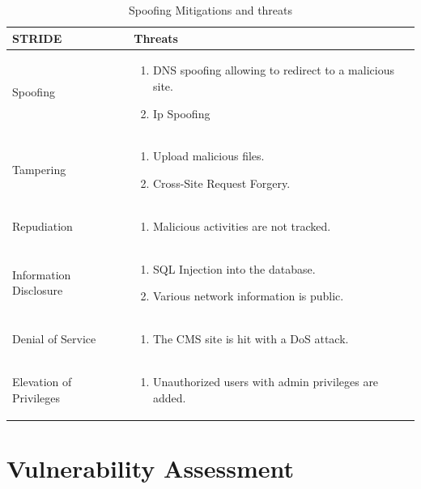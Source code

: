 \begingroup
\centering
\setlength{\tabcolsep}{6.5pt} %
\renewcommand{\arraystretch}{1.8} %
\begin{longtable}{ |p{7cm}| p{8cm} |}
\caption{Spoofing Mitigations and threats}
    \label{table:spoofing}
\hline
\textbf{STRIDE} & \textbf{Threats}\\
\hline
Spoofing & \begin{enumerate}
    \item DNS spoofing allowing to redirect to a malicious site.
    \item Ip Spoofing \citep[p.~2]{ip_spoofing}
\end{enumerate} \\
\hline
Tampering & \begin{enumerate}
    \item Upload malicious files.
    \item Cross-Site Request Forgery. \citep[p.~538]{crsf}
\end{enumerate} \\
\hline
Repudiation & \begin{enumerate}
    \item Malicious activities are not tracked.
\end{enumerate} \\
\hline
Information Disclosure & \begin{enumerate}
    \item SQL Injection into the database.
    \item Various network information is public.
\end{enumerate} \\
\hline
Denial of Service & \begin{enumerate}
    \item The CMS site is hit with a DoS attack.
\end{enumerate} \\
\hline
Elevation of Privileges & \begin{enumerate}
    \item Unauthorized users with admin privileges are added.
\end{enumerate} \\
\hline
\end{longtable}
\endgroup

\section{Vulnerability Assessment}